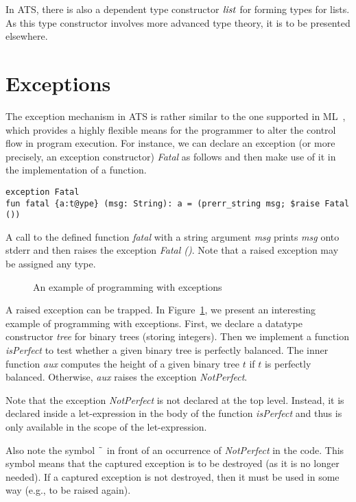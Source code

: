 In ATS, there is also a dependent type constructor ${\it list}$ for forming
types for lists. As this type constructor involves more advanced type
theory, it is to be presented elsewhere.

\section{Exceptions}
The exception mechanism in ATS is rather similar to the one supported in
ML~\cite{SML97}, which provides a highly flexible means for the programmer
to alter the control flow in program execution. For instance, we can
declare an exception (or more precisely, an exception constructor) {\em
Fatal} as follows and then make use of it in the implementation of a
function.
\begin{verbatim}
exception Fatal
fun fatal {a:t@ype} (msg: String): a = (prerr_string msg; $raise Fatal ())
\end{verbatim}
A call to the defined function {\it fatal} with a string argument {\it msg}
prints {\it msg} onto stderr and then raises the exception {\it Fatal ()}.
Note that a raised exception may be assigned any type.

\begin{figure}[thp]

\caption{An example of programming with exceptions}
\label{figure:isPerfect}
\end{figure}
A raised exception can be trapped.  In Figure~\ref{figure:isPerfect}, we
present an interesting example of programming with exceptions. First, we
declare a datatype constructor {\it tree} for binary trees (storing
integers). Then we implement a function {\it isPerfect} to test whether a
given binary tree is perfectly balanced.  The inner function {\it aux}
computes the height of a given binary tree $t$ if $t$ is perfectly
balanced. Otherwise, {\it aux} raises the exception {\it NotPerfect}.

Note that the exception {\it NotPerfect} is not declared at the top
level. Instead, it is declared inside a let-expression in the body of the
function {\it isPerfect} and thus is only available in the scope of the
let-expression.

Also note the symbol $\char126$ in front of an occurrence of {\it
NotPerfect} in the code.  This symbol means that the captured exception is
to be destroyed (as it is no longer needed). If a captured exception is not
destroyed, then it must be used in some way (e.g., to be raised again).

